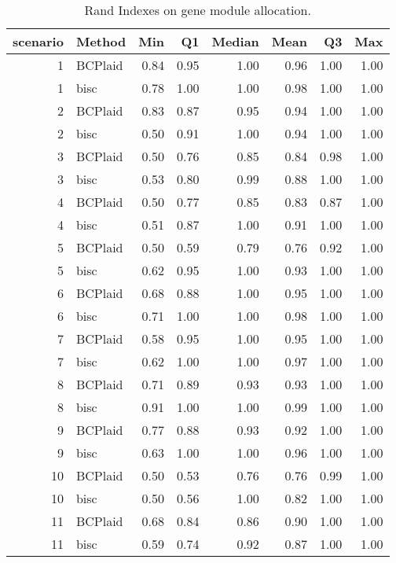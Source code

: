 \begin{table}[ht]
\caption{Rand Indexes on gene module allocation.}
\vspace{1.5cm}
\centering
\begin{tabular}{rlrrrrrr}
  \toprule
scenario & Method & Min & Q1 & Median & Mean & Q3 & Max \\ 
  \midrule
  1 & BCPlaid & 0.84 & 0.95 & 1.00 & 0.96 & 1.00 & 1.00 \\ 
    1 & bisc & 0.78 & 1.00 & 1.00 & 0.98 & 1.00 & 1.00 \\ 
    2 & BCPlaid & 0.83 & 0.87 & 0.95 & 0.94 & 1.00 & 1.00 \\ 
    2 & bisc & 0.50 & 0.91 & 1.00 & 0.94 & 1.00 & 1.00 \\ 
    3 & BCPlaid & 0.50 & 0.76 & 0.85 & 0.84 & 0.98 & 1.00 \\ 
    3 & bisc & 0.53 & 0.80 & 0.99 & 0.88 & 1.00 & 1.00 \\ 
    4 & BCPlaid & 0.50 & 0.77 & 0.85 & 0.83 & 0.87 & 1.00 \\ 
    4 & bisc & 0.51 & 0.87 & 1.00 & 0.91 & 1.00 & 1.00 \\ 
    5 & BCPlaid & 0.50 & 0.59 & 0.79 & 0.76 & 0.92 & 1.00 \\ 
    5 & bisc & 0.62 & 0.95 & 1.00 & 0.93 & 1.00 & 1.00 \\ 
    6 & BCPlaid & 0.68 & 0.88 & 1.00 & 0.95 & 1.00 & 1.00 \\ 
    6 & bisc & 0.71 & 1.00 & 1.00 & 0.98 & 1.00 & 1.00 \\ 
    7 & BCPlaid & 0.58 & 0.95 & 1.00 & 0.95 & 1.00 & 1.00 \\ 
    7 & bisc & 0.62 & 1.00 & 1.00 & 0.97 & 1.00 & 1.00 \\ 
    8 & BCPlaid & 0.71 & 0.89 & 0.93 & 0.93 & 1.00 & 1.00 \\ 
    8 & bisc & 0.91 & 1.00 & 1.00 & 0.99 & 1.00 & 1.00 \\ 
    9 & BCPlaid & 0.77 & 0.88 & 0.93 & 0.92 & 1.00 & 1.00 \\ 
    9 & bisc & 0.63 & 1.00 & 1.00 & 0.96 & 1.00 & 1.00 \\ 
   10 & BCPlaid & 0.50 & 0.53 & 0.76 & 0.76 & 0.99 & 1.00 \\ 
   10 & bisc & 0.50 & 0.56 & 1.00 & 0.82 & 1.00 & 1.00 \\ 
   11 & BCPlaid & 0.68 & 0.84 & 0.86 & 0.90 & 1.00 & 1.00 \\ 
   11 & bisc & 0.59 & 0.74 & 0.92 & 0.87 & 1.00 & 1.00 \\ 

\end{tabular}
\end{table}
